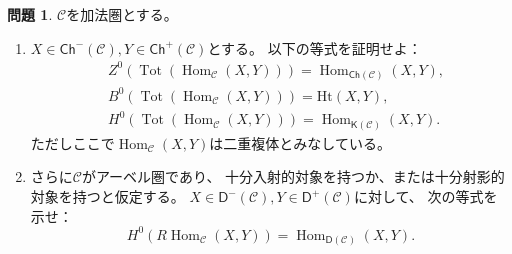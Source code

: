 \documentclass[uplatex,dvipdfmx]{jsarticle}
\theoremstyle{definition}
\newtheorem{prob}[prob]{問題}
\DeclareMathOperator{\Hom}{\mathrm{Hom}}
\DeclareMathOperator{\Tot}{\mathrm{Tot}}
\newcommand{\Ch}{\mathsf{Ch}}
\newcommand{\sfK}{\mathsf{K}}
\newcommand{\sfD}{\mathsf{D}}
\newcommand{\Ht}{\mathrm{Ht}}
\newcommand\mcC{\mathcal{C}}
\begin{document}
\begin{prob}\label{1.16}
  \(\mcC\)を加法圏とする。
  \begin{enumerate}
    \item \label{1.16.1}
    \(X\in \Ch^-(\mcC), Y\in \Ch^+(\mcC)\)とする。
    以下の等式を証明せよ：
    \begin{align*}
      &Z^0(\Tot(\Hom_{\mcC}(X,Y))) = \Hom_{\Ch(\mcC)}(X,Y), \\
      &B^0(\Tot(\Hom_{\mcC}(X,Y))) = \Ht(X,Y), \\
      &H^0(\Tot(\Hom_{\mcC}(X,Y))) = \Hom_{\sfK(\mcC)}(X,Y).
    \end{align*}
    ただしここで\(\Hom_{\mcC}(X,Y)\)は二重複体とみなしている。
    \item \label{1.16.2}
    さらに\(\mcC\)がアーベル圏であり、
    十分入射的対象を持つか、または十分射影的対象を持つと仮定する。
    \(X\in \sfD^-(\mcC),Y\in \sfD^+(\mcC)\)に対して、
    次の等式を示せ：
    \[
    H^0(R\Hom_{\mcC}(X,Y)) = \Hom_{\sfD(\mcC)}(X,Y).
    \]
  \end{enumerate}
\end{prob}
\end{document}

